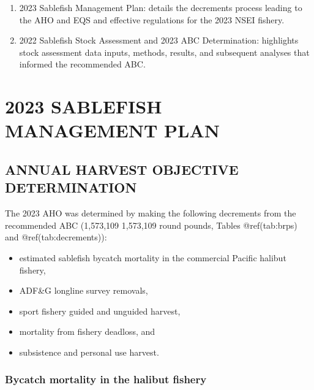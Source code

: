 \documentclass[
]{article}
\providecommand{\tightlist}{%
  \setlength{\itemsep}{0pt}\setlength{\parskip}{0pt}}
\begin{document}
\begin{enumerate}
\def\labelenumi{\arabic{enumi}.}
\tightlist
\item
  2023 Sablefish Management Plan: details the decrements process leading
  to the AHO and EQS and effective regulations for the 2023 NSEI
  fishery.
\item
  2022 Sablefish Stock Assessment and 2023 ABC Determination: highlights
  stock assessment data inputs, methods, results, and subsequent
  analyses that informed the recommended ABC.
\end{enumerate}

\hypertarget{sablefish-management-plan}{%
\section{2023 SABLEFISH MANAGEMENT
PLAN}\label{sablefish-management-plan}}

\hypertarget{annual-harvest-objective-determination}{%
\subsection{ANNUAL HARVEST OBJECTIVE
DETERMINATION}\label{annual-harvest-objective-determination}}

The 2023 AHO was determined by making the following decrements from the
recommended ABC (1,573,109 1,573,109 round pounds, Tables @ref(tab:brps)
and @ref(tab:decrements)):

\begin{itemize}
\tightlist
\item
  estimated sablefish bycatch mortality in the commercial Pacific
  halibut fishery,
\item
  ADF\&G longline survey removals,
\item
  sport fishery guided and unguided harvest,
\item
  mortality from fishery deadloss, and
\item
  subsistence and personal use harvest.
\end{itemize}

\hypertarget{bycatch-mortality-in-the-halibut-fishery}{%
\subsubsection{Bycatch mortality in the halibut
fishery}\label{bycatch-mortality-in-the-halibut-fishery}}
\end{document}
